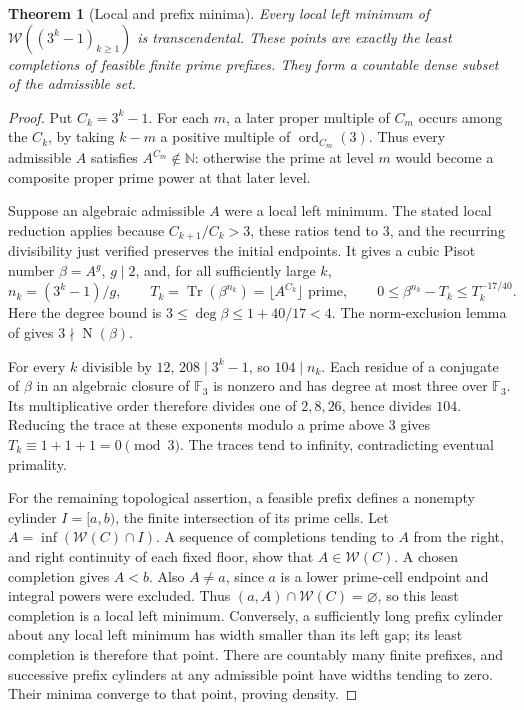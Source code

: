 \documentclass[11pt,a4paper]{article}
\newtheorem{theorem}{Theorem}[section]
\theoremstyle{definition}\newtheorem{definition}[theorem]{Definition}
\theoremstyle{remark}\newtheorem{remark}[theorem]{Remark}
\begin{document}
\begin{theorem}[Local and prefix minima]\label{init:prefix-minima}
Every local left minimum of
$\mathcal W((3^k-1)_{k\ge1})$ is transcendental.
These points are exactly the least completions of feasible finite prime
prefixes. They form a countable dense subset of the admissible set.
\end{theorem}
\begin{proof}
Put $C_k=3^k-1$. For each $m$, a later proper multiple of $C_m$
occurs among the $C_k$, by taking $k-m$ a positive multiple of
$\operatorname{ord}_{C_m}(3)$. Thus every admissible $A$ satisfies
$A^{C_m}\notin\mathbb N$: otherwise the prime at level $m$ would
become a composite proper prime power at that later level.

Suppose an algebraic admissible $A$ were a local left minimum.
The stated local reduction applies because $C_{k+1}/C_k>3$,
these ratios tend to $3$, and the recurring divisibility just verified
preserves the initial endpoints. It gives a cubic Pisot number
$\beta=A^g$, $g\mid2$, and, for all sufficiently large $k$,
\[
 n_k=(3^k-1)/g,\qquad
 T_k=\operatorname{Tr}(\beta^{n_k})=\lfloor A^{C_k}\rfloor\text{ prime},
 \qquad 0\le\beta^{n_k}-T_k\le T_k^{-17/40}.
\]
Here the degree bound is $3\le\deg\beta\le1+40/17<4$.
The norm-exclusion lemma of \cite{K064} gives
$3\nmid\operatorname{N}(\beta)$.

For every $k$ divisible by $12$, $208\mid3^k-1$, so $104\mid n_k$.
Each residue of a conjugate of $\beta$ in an algebraic closure of
$\mathbb F_3$ is nonzero and has degree at most three over
$\mathbb F_3$. Its multiplicative order therefore divides one of
$2,8,26$, hence divides $104$. Reducing the trace at these exponents
modulo a prime above $3$ gives $T_k\equiv1+1+1=0\pmod3$.
The traces tend to infinity, contradicting eventual primality.

For the remaining topological assertion, a feasible prefix defines a
nonempty cylinder $I=[a,b)$, the finite intersection of its prime cells.
Let $A=\inf(\mathcal W(C)\cap I)$. A sequence of completions tending
to $A$ from the right, and right continuity of each fixed floor, show
that $A\in\mathcal W(C)$. A chosen completion gives $A<b$.
Also $A\ne a$, since $a$ is a lower prime-cell endpoint and integral
powers were excluded. Thus $(a,A)\cap\mathcal W(C)=\varnothing$,
so this least completion is a local left minimum.
Conversely, a sufficiently long prefix cylinder about any local left
minimum has width smaller than its left gap; its least completion is
therefore that point. There are countably many finite prefixes, and
successive prefix cylinders at any admissible point have widths tending
to zero. Their minima converge to that point, proving density.
\end{proof}
\end{document}
